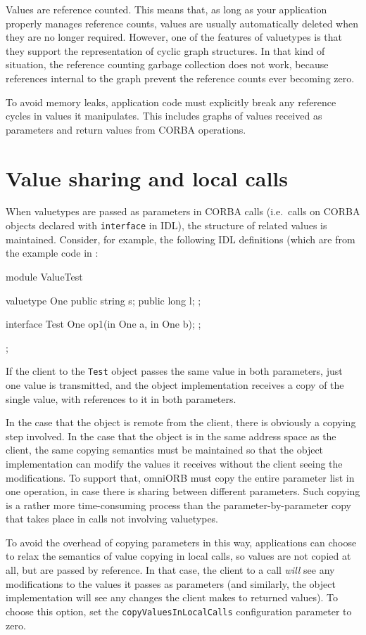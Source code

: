 \documentclass[11pt,twoside,a4paper]{book}
\newcommand{\type}[1]{\texttt{#1}}
\newcommand{\code}[1]{\texttt{#1}}
\newcommand{\file}{\begingroup \urlstyle{tt}\Url}
\begin{document}
Values are reference counted. This means that, as long as your
application properly manages reference counts, values are usually
automatically deleted when they are no longer required. However, one
of the features of valuetypes is that they support the representation
of cyclic graph structures. In that kind of situation, the reference
counting garbage collection does not work, because references internal
to the graph prevent the reference counts ever becoming zero.

To avoid memory leaks, application code must explicitly break any
reference cycles in values it manipulates. This includes graphs of
values received as parameters and return values from CORBA operations.


\section{Value sharing and local calls}

When valuetypes are passed as parameters in CORBA calls (i.e.\ calls
on CORBA objects declared with \code{interface} in IDL), the structure
of related values is maintained. Consider, for example, the following
IDL definitions (which are from the example code in
\file{src/examples/valuetype/simple}:

\begin{idllisting}
module ValueTest {
  valuetype One {
    public string s;
    public long   l;
  };

  interface Test {
    One op1(in One a, in One b);
  };
};
\end{idllisting}

If the client to the \type{Test} object passes the same value in both
parameters, just one value is transmitted, and the object
implementation receives a copy of the single value, with references to
it in both parameters.

In the case that the object is remote from the client, there is
obviously a copying step involved. In the case that the object is in
the same address space as the client, the same copying semantics must
be maintained so that the object implementation can modify the values
it receives without the client seeing the modifications. To support
that, omniORB must copy the entire parameter list in one operation, in
case there is sharing between different parameters. Such copying is a
rather more time-consuming process than the parameter-by-parameter
copy that takes place in calls not involving valuetypes.

To avoid the overhead of copying parameters in this way, applications
can choose to relax the semantics of value copying in local calls, so
values are not copied at all, but are passed by reference. In that
case, the client to a call \emph{will} see any modifications to the
values it passes as parameters (and similarly, the object
implementation will see any changes the client makes to returned
values). To choose this option, set the \code{copyValuesInLocalCalls}
configuration parameter to zero.
\end{document}

